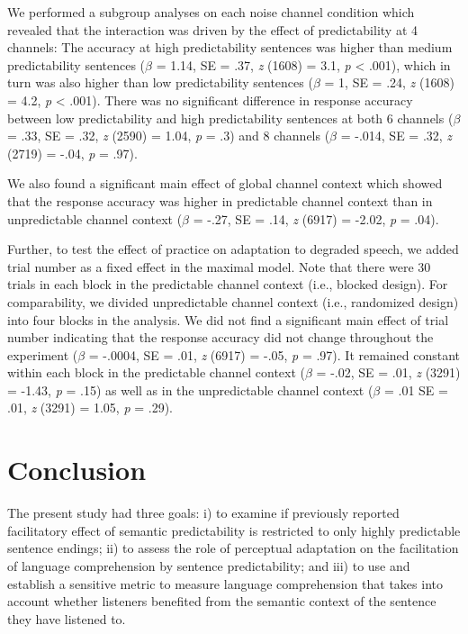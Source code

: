 \documentclass[a4paper, nobind]{templates/ociamthesis}
\begin{document}
We performed a subgroup analyses on each noise channel condition
which revealed that the interaction was driven by the effect of predictability at 4 channels:
The accuracy at high predictability sentences was higher than medium predictability sentences (\(\beta\) = 1.14, SE = .37, \emph{z} (1608) = 3.1, \emph{p} \textless{} .001),
which in turn was also higher than low predictability sentences (\(\beta\) = 1, SE = .24, \emph{z} (1608) = 4.2, \emph{p} \textless{} .001).
There was no significant difference in response accuracy between low predictability and high predictability sentences
at both 6 channels (\(\beta\) = .33, SE = .32, \emph{z} (2590) = 1.04, \emph{p} = .3)
and 8 channels (\(\beta\) = -.014, SE = .32, \emph{z} (2719) = -.04, \emph{p} = .97).

We also found a significant main effect of global channel context which showed that the response accuracy was higher in predictable channel context than in unpredictable channel context (\(\beta\) = -.27, SE = .14, \emph{z} (6917) = -2.02, \emph{p} = .04).

Further, to test the effect of practice on adaptation to degraded speech, we added trial number as a fixed effect in the maximal model.
Note that there were 30 trials in each block in the predictable channel context (i.e., blocked design).
For comparability, we divided unpredictable channel context (i.e., randomized design) into four blocks in the analysis.
We did not find a significant main effect of trial number indicating that the response accuracy did not change throughout the experiment (\(\beta\) = -.0004, SE = .01, \emph{z} (6917) = -.05, \emph{p} = .97).
It remained constant within each block in the predictable channel context (\(\beta\) = -.02, SE = .01, \emph{z} (3291) = -1.43, \emph{p} = .15) as well as in the unpredictable channel context (\(\beta\) = .01 SE = .01, \emph{z} (3291) = 1.05, \emph{p} = .29).

\hypertarget{conclusion-1}{%
\section{Conclusion}\label{conclusion-1}}

The present study had three goals: i) to examine if previously reported facilitatory effect of semantic predictability is restricted to only highly predictable sentence endings;
ii) to assess the role of perceptual adaptation on the facilitation of language comprehension by sentence predictability; and
iii) to use and establish a sensitive metric to measure language comprehension that takes into account whether listeners benefited from the semantic context of the sentence they have listened to.
\end{document}
